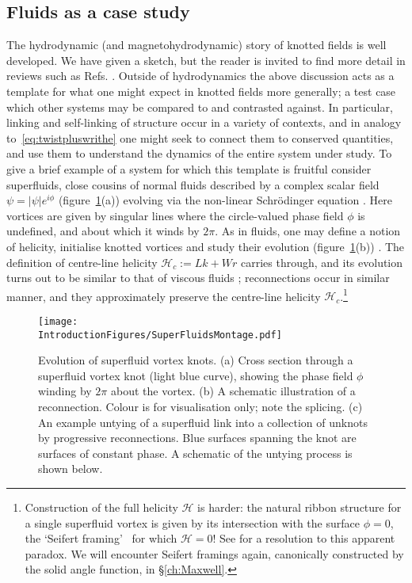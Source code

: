 \subsection{Fluids as a case study}
The hydrodynamic (and magnetohydrodynamic) story of knotted fields is well developed. We have given a sketch, but the reader is invited to find more detail in reviews such as Refs. \citep{Moffatt2014, Irvine2018}. Outside of hydrodynamics the above discussion acts as a template for what one might expect in knotted fields more generally; a test case which other systems may be compared to and contrasted against. In particular, linking and self-linking of structure occur in a variety of contexts, and in analogy to~\eqref{eq:twistpluswrithe} one might seek to connect them to conserved quantities, and use them to understand the dynamics of the entire system under study. To give a brief example of a system for which this template is fruitful consider superfluids, close cousins of normal fluids described by a complex scalar field $\psi = |\psi| e^{i \phi}$ (figure~\ref{fig:SuperFluidMontage}(a)) evolving via the non-linear Schr\"odinger equation \citep{Kleckner2016}. Here vortices are given by singular lines where the circle-valued phase field $\phi$ is undefined, and about which it winds by $2\pi$. As in fluids, one may define a notion of helicity, initialise knotted vortices and study their evolution (figure~\ref{fig:SuperFluidMontage}(b)) \citep{Scheeler2014, Kleckner2016}. The definition of centre-line helicity $\mathcal{H}_c := Lk + Wr$ carries through, and its evolution turns out to be similar to that of viscous fluids \citep{Scheeler2014, Kleckner2016}; reconnections occur in similar manner, and they approximately preserve the centre-line helicity $\mathcal{H}_c$.\footnote{ \label{footnote:Seifert} Construction of the full helicity $\mathcal{H}$ is harder: the natural ribbon structure for a single superfluid vortex is given by its intersection with the surface $\phi =0$, the `Seifert framing'~\citep{Winfree1983c,MoffattBook} for which $\mathcal{H}=0$! See \citep{Salman2016,Salman2017,Kedia2018a} for a resolution to this apparent paradox. We will encounter Seifert framings again, canonically constructed by the solid angle function, in \S \ref{ch:Maxwell}.}
\begin{figure}[htbp]
\centering
\texttt{[image: \\IntroductionFigures/SuperFluidsMontage.pdf]}
\caption{Evolution of superfluid vortex knots. (a) Cross section through a superfluid vortex knot (light blue curve), showing the phase field $\phi$ winding by $2 \pi$ about the vortex. (b) A schematic illustration of a reconnection. Colour is for visualisation only; note the splicing. (c) An example untying of a superfluid link into a collection of unknots by progressive reconnections. Blue surfaces spanning the knot are surfaces of constant phase. A schematic of the untying process is shown below.}
\label{fig:SuperFluidMontage}
\end{figure}

